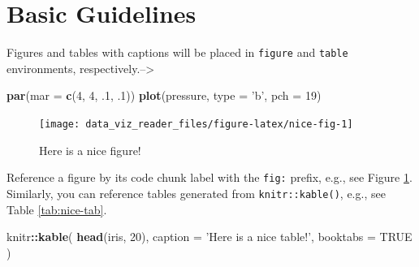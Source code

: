 \documentclass[]{book}
\newenvironment{Shaded}{\begin{snugshade}}{\end{snugshade}}
\newcommand{\KeywordTok}[1]{\textcolor[rgb]{0.13,0.29,0.53}{\textbf{#1}}}
\newcommand{\DataTypeTok}[1]{\textcolor[rgb]{0.13,0.29,0.53}{#1}}
\newcommand{\DecValTok}[1]{\textcolor[rgb]{0.00,0.00,0.81}{#1}}
\newcommand{\StringTok}[1]{\textcolor[rgb]{0.31,0.60,0.02}{#1}}
\newcommand{\OtherTok}[1]{\textcolor[rgb]{0.56,0.35,0.01}{#1}}
\newcommand{\OperatorTok}[1]{\textcolor[rgb]{0.81,0.36,0.00}{\textbf{#1}}}
\newcommand{\NormalTok}[1]{#1}
\theoremstyle{definition}
\theoremstyle{definition}
\theoremstyle{definition}
\theoremstyle{remark}
\begin{document}
\section{Basic Guidelines}\label{basic-guidelines}

Figures and tables with captions will be placed in \texttt{figure} and
\texttt{table} environments, respectively.--\textgreater{}

\begin{Shaded}
\begin{Highlighting}[]
\KeywordTok{par}\NormalTok{(}\DataTypeTok{mar =} \KeywordTok{c}\NormalTok{(}\DecValTok{4}\NormalTok{, }\DecValTok{4}\NormalTok{, .}\DecValTok{1}\NormalTok{, .}\DecValTok{1}\NormalTok{))}
\KeywordTok{plot}\NormalTok{(pressure, }\DataTypeTok{type =} \StringTok{'b'}\NormalTok{, }\DataTypeTok{pch =} \DecValTok{19}\NormalTok{)}
\end{Highlighting}
\end{Shaded}

\begin{figure}

{\centering \texttt{[image: data\_viz\_reader\_files/figure-latex/nice-fig-1]} 

}

\caption{Here is a nice figure!}\label{fig:nice-fig}
\end{figure}

Reference a figure by its code chunk label with the \texttt{fig:}
prefix, e.g., see Figure \ref{fig:nice-fig}. Similarly, you can
reference tables generated from \texttt{knitr::kable()}, e.g., see Table
\ref{tab:nice-tab}.

\begin{Shaded}
\begin{Highlighting}[]
\NormalTok{knitr}\OperatorTok{::}\KeywordTok{kable}\NormalTok{(}
 \KeywordTok{head}\NormalTok{(iris, }\DecValTok{20}\NormalTok{), }\DataTypeTok{caption =} \StringTok{'Here is a nice table!'}\NormalTok{,}
 \DataTypeTok{booktabs =} \OtherTok{TRUE}
\NormalTok{)}
\end{Highlighting}
\end{Shaded}
\end{document}
